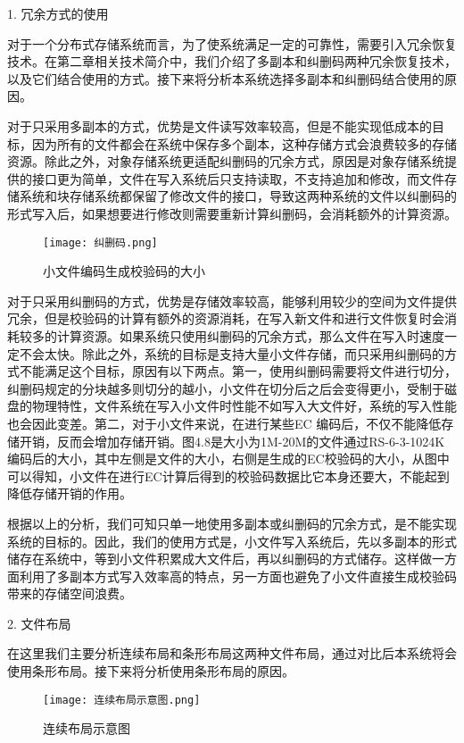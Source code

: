 1. 冗余方式的使用

对于一个分布式存储系统而言，为了使系统满足一定的可靠性，需要引入冗余恢复技术。在第二章相关技术简介中，我们介绍了多副本和纠删码两种冗余恢复技术，以及它们结合使用的方式。接下来将分析本系统选择多副本和纠删码结合使用的原因。

对于只采用多副本的方式，优势是文件读写效率较高，但是不能实现低成本的目标，因为所有的文件都会在系统中保存多个副本，这种存储方式会浪费较多的存储资源。除此之外，对象存储系统更适配纠删码的冗余方式，原因是对象存储系统提供的接口更为简单，文件在写入系统后只支持读取，不支持追加和修改，而文件存储系统和块存储系统都保留了修改文件的接口，导致这两种系统的文件以纠删码的形式写入后，如果想要进行修改则需要重新计算纠删码，会消耗额外的计算资源。

\begin{figure}[h]
  \centering
  \texttt{[image: 纠删码.png]}
  \caption{小文件编码生成校验码的大小}
\end{figure}

对于只采用纠删码的方式，优势是存储效率较高，能够利用较少的空间为文件提供冗余，但是校验码的计算有额外的资源消耗，在写入新文件和进行文件恢复时会消耗较多的计算资源。如果系统只使用纠删码的冗余方式，那么文件在写入时速度一定不会太快。除此之外，系统的目标是支持大量小文件存储，而只采用纠删码的方式不能满足这个目标，原因有以下两点。第一，使用纠删码需要将文件进行切分，纠删码规定的分块越多则切分的越小，小文件在切分后之后会变得更小，受制于磁盘的物理特性，文件系统在写入小文件时性能不如写入大文件好，系统的写入性能也会因此变差。第二，对于小文件来说，在进行某些EC 编码后，不仅不能降低存储开销，反而会增加存储开销。图4.8是大小为1M-20M的文件通过RS-6-3-1024K编码后的大小，其中左侧是文件的大小，右侧是生成的EC校验码的大小，从图中可以得知，小文件在进行EC计算后得到的校验码数据比它本身还要大，不能起到降低存储开销的作用。

根据以上的分析，我们可知只单一地使用多副本或纠删码的冗余方式，是不能实现系统的目标的。因此，我们的使用方式是，小文件写入系统后，先以多副本的形式储存在系统中，等到小文件积累成大文件后，再以纠删码的方式储存。这样做一方面利用了多副本方式写入效率高的特点，另一方面也避免了小文件直接生成校验码带来的存储空间浪费。

2. 文件布局

在这里我们主要分析连续布局和条形布局这两种文件布局，通过对比后本系统将会使用条形布局。接下来将分析使用条形布局的原因。

\begin{figure}[h]
  \centering
  \texttt{[image: 连续布局示意图.png]}
  \caption{连续布局示意图}
\end{figure}

